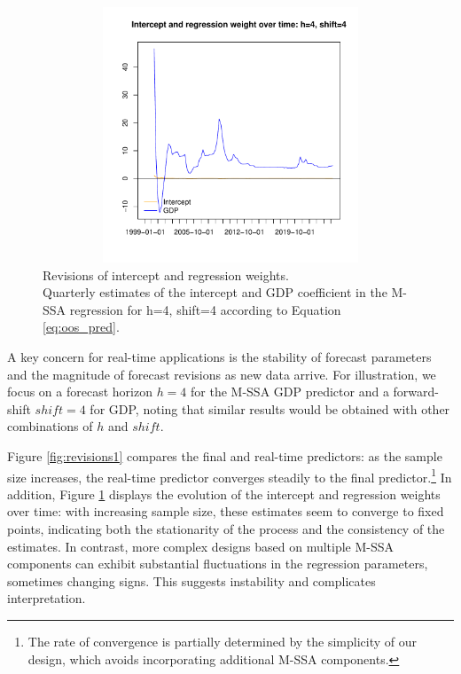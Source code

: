 \documentclass[11pt,a4paper]{article}
\begin{document}
\begin{figure}[h!]
    \begin{center}
        \includegraphics[height=3in, width=4.5in]{./Figures/revisions2.pdf}
        \caption{Revisions of intercept and regression weights.\\
        Quarterly estimates of the intercept and GDP coefficient in the M-SSA regression for h=4, shift=4 according to Equation \eqref{eq:oos_pred}.
        \label{fig:revisions2}}
    \end{center}
\end{figure}

A key concern for real-time applications is the stability of forecast parameters and the magnitude of forecast revisions as new data arrive. For illustration, we focus on a forecast horizon $h=4$ for the M-SSA GDP predictor and a forward-shift $shift=4$ for GDP, noting that similar results would be obtained with other combinations of $h$ and $shift$. 

Figure \ref{fig:revisions1} compares the final and real-time predictors: as the sample size increases, the real-time predictor converges steadily to the final predictor.\footnote{The rate of convergence is partially determined by the simplicity of our design, which avoids incorporating additional M-SSA components.} 
In addition, Figure \ref{fig:revisions2} displays the evolution of the intercept and regression weights over time: with increasing sample size, these estimates seem to converge to fixed points, indicating both the stationarity of the process and the consistency of the estimates. %
In contrast, more complex designs based on multiple M-SSA components can exhibit substantial fluctuations in the regression parameters, sometimes changing signs. This suggests instability and complicates interpretation.
\end{document}

